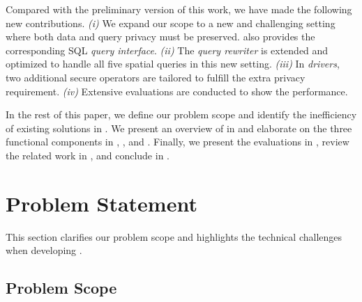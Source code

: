 Compared with the preliminary version \cite{DBLP:journals/pvldb/TongPZSXZZCXXL22} of this work, we have made the following new contributions.
\textit{(i)} We expand our scope to a new and challenging setting where both data and query privacy must be preserved. 
\sysname also provides the corresponding SQL \textit{query interface}.
\textit{(ii)} The \textit{query rewriter} is extended and optimized to handle all five spatial queries in this new setting.
\textit{(iii)} In \textit{drivers}, two additional secure operators are tailored to fulfill the extra privacy requirement.
\textit{(iv)} Extensive evaluations are conducted to show the performance.

In the rest of this paper, we define our problem scope and identify the inefficiency of existing solutions in . We present an overview of \sysname in  and elaborate on the three functional components in , , and .
Finally, we present the evaluations in , review the related work in , and conclude in .

\section{Problem Statement}
\label{sec:statement}

This section clarifies our problem scope and highlights the technical challenges when developing \sysname.

\subsection{Problem Scope}
\label{subsec:problem}

